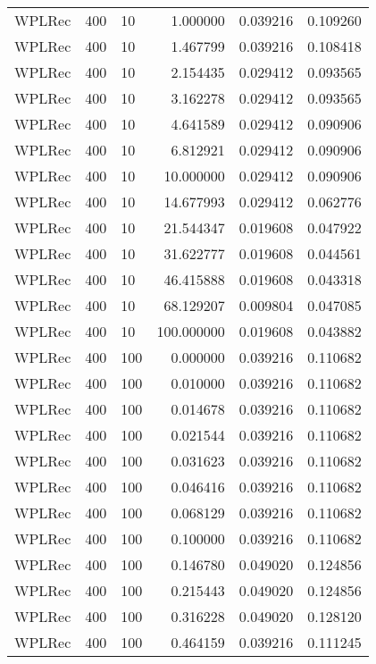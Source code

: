 \begin{tabular}{lllrrr}
 WPLRec &  400 &     10 &    1.000000 &     0.039216 &  0.109260 \\
 WPLRec &  400 &     10 &    1.467799 &     0.039216 &  0.108418 \\
 WPLRec &  400 &     10 &    2.154435 &     0.029412 &  0.093565 \\
 WPLRec &  400 &     10 &    3.162278 &     0.029412 &  0.093565 \\
 WPLRec &  400 &     10 &    4.641589 &     0.029412 &  0.090906 \\
 WPLRec &  400 &     10 &    6.812921 &     0.029412 &  0.090906 \\
 WPLRec &  400 &     10 &   10.000000 &     0.029412 &  0.090906 \\
 WPLRec &  400 &     10 &   14.677993 &     0.029412 &  0.062776 \\
 WPLRec &  400 &     10 &   21.544347 &     0.019608 &  0.047922 \\
 WPLRec &  400 &     10 &   31.622777 &     0.019608 &  0.044561 \\
 WPLRec &  400 &     10 &   46.415888 &     0.019608 &  0.043318 \\
 WPLRec &  400 &     10 &   68.129207 &     0.009804 &  0.047085 \\
 WPLRec &  400 &     10 &  100.000000 &     0.019608 &  0.043882 \\
 WPLRec &  400 &    100 &    0.000000 &     0.039216 &  0.110682 \\
 WPLRec &  400 &    100 &    0.010000 &     0.039216 &  0.110682 \\
 WPLRec &  400 &    100 &    0.014678 &     0.039216 &  0.110682 \\
 WPLRec &  400 &    100 &    0.021544 &     0.039216 &  0.110682 \\
 WPLRec &  400 &    100 &    0.031623 &     0.039216 &  0.110682 \\
 WPLRec &  400 &    100 &    0.046416 &     0.039216 &  0.110682 \\
 WPLRec &  400 &    100 &    0.068129 &     0.039216 &  0.110682 \\
 WPLRec &  400 &    100 &    0.100000 &     0.039216 &  0.110682 \\
 WPLRec &  400 &    100 &    0.146780 &     0.049020 &  0.124856 \\
 WPLRec &  400 &    100 &    0.215443 &     0.049020 &  0.124856 \\
 WPLRec &  400 &    100 &    0.316228 &     0.049020 &  0.128120 \\
 WPLRec &  400 &    100 &    0.464159 &     0.039216 &  0.111245 \\

\end{tabular}
